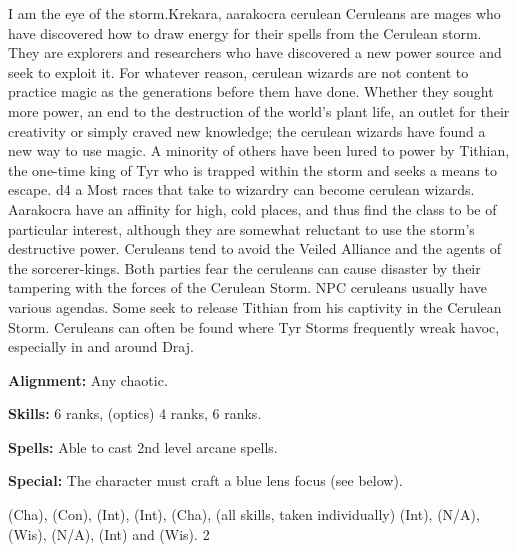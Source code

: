 {I am the eye of the storm.}{Krekara, aarakocra cerulean}
{
Ceruleans are mages who have discovered how to draw energy for their spells from the Cerulean storm. They are explorers and researchers who have discovered a new power source and seek to exploit it. For whatever reason, cerulean wizards are not content to practice magic as the generations before them have done. Whether they sought more power, an end to the destruction of the world's plant life, an outlet for their creativity or simply craved new knowledge; the cerulean wizards have found a new way to use magic. A minority of others have been lured to power by Tithian, the one-time king of Tyr who is trapped within the storm and seeks a means to escape.
}
{d4}
{a}
{
Most races that take to wizardry can become cerulean wizards. Aarakocra have an affinity for high, cold places, and thus find the class to be of particular interest, although they are somewhat reluctant to use the storm's destructive power. Ceruleans tend to avoid the Veiled Alliance and the agents of the sorcerer-kings. Both parties fear the ceruleans can cause disaster by their tampering with the forces of the Cerulean Storm. NPC ceruleans usually have various agendas. Some seek to release Tithian from his captivity in the Cerulean Storm. Ceruleans can often be found where Tyr Storms frequently wreak havoc, especially in and around Draj.
}
{
\textbf{Alignment:} Any chaotic.

\textbf{Skills:}  6 ranks,  (optics) 4 ranks,  6 ranks.


\textbf{Spells:} Able to cast 2nd level arcane spells.

\textbf{Special:} The character must craft a blue lens focus (see below).
}
{ (Cha),  (Con),  (Int),  (Int),  (Cha),  (all skills, taken individually) (Int),  (N/A),  (Wis),  (N/A),  (Int) and  (Wis).}
{2}
